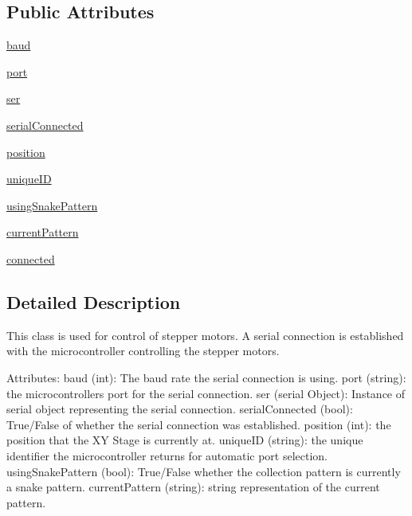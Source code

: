 \subsection*{Public Attributes}
\begin{DoxyCompactItemize}
\item 
\mbox{\hyperlink{class_collection_1_1_collectador_a06c835183d4c66cf6c91c2e34ee3e2b6}{baud}}
\item 
\mbox{\hyperlink{class_collection_1_1_collectador_a550345b45c253014500953908ed1a995}{port}}
\item 
\mbox{\hyperlink{class_collection_1_1_collectador_ad9a27d34d324f18bffea08b5aee3a765}{ser}}
\item 
\mbox{\hyperlink{class_collection_1_1_collectador_a6118ba10835a3655e0a048fadf444942}{serial\+Connected}}
\item 
\mbox{\hyperlink{class_collection_1_1_collectador_aa037ff041a29101bf42cde6fdb21061c}{position}}
\item 
\mbox{\hyperlink{class_collection_1_1_collectador_a13c3d036cddedace173688b51df275d5}{unique\+ID}}
\item 
\mbox{\hyperlink{class_collection_1_1_collectador_a7f70d1594de2d80376651c27572a6c1a}{using\+Snake\+Pattern}}
\item 
\mbox{\hyperlink{class_collection_1_1_collectador_a00073580ab88239050ae7be768fe8b23}{current\+Pattern}}
\item 
\mbox{\hyperlink{class_collection_1_1_collectador_a63f1c56b2b8bc80791fae03b9f6026ef}{connected}}
\end{DoxyCompactItemize}


\subsection{Detailed Description}
\begin{DoxyVerb}This class is used for control of stepper motors. A serial connection is established with the microcontroller controlling the stepper motors.

Attributes:
    baud (int): The baud rate the serial connection is using.
    port (string): the microcontrollers port for the serial connection.
    ser (serial Object): Instance of serial object representing the serial connection.
    serialConnected (bool): True/False of whether the serial connection was established.
    position (int): the position that the XY Stage is currently at.
    uniqueID (string): the unique identifier the microcontroller returns for automatic port selection.
    usingSnakePattern (bool): True/False whether the collection pattern is currently a snake pattern.
    currentPattern (string): string representation of the current pattern.
\end{DoxyVerb}
 

